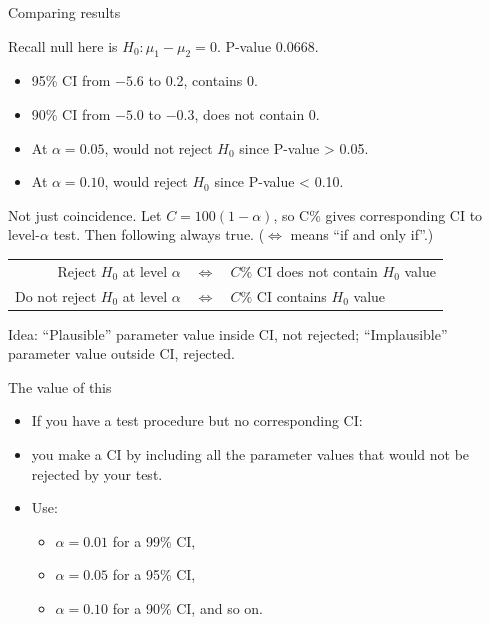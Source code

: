 \documentclass[
  ignorenonframetext,
]{beamer}
\providecommand{\tightlist}{%
  \setlength{\itemsep}{0pt}\setlength{\parskip}{0pt}}
\begin{document}
\begin{frame}{Comparing results}
\protect\hypertarget{comparing-results}{}

Recall null here is \(H_0 : \mu_1 - \mu_2 = 0\). P-value 0.0668.

\begin{itemize}
\tightlist
\item
  95\% CI from \(-5.6\) to 0.2, contains 0.
\item
  90\% CI from \(-5.0\) to \(-0.3\), does not contain 0.
\item
  At \(\alpha = 0.05\), would not reject \(H_0\) since P-value
  \textgreater{} 0.05.
\item
  At \(\alpha = 0.10\), would reject \(H_0\) since P-value \textless{}
  0.10.
\end{itemize}

Not just coincidence. Let \(C = 100(1 - \alpha)\), so C\% gives
corresponding CI to level-\(\alpha\) test. Then following always true.
(\(\iff\) means ``if and only if''.)

\begin{tabular}{|rcl|}
  \hline
  Reject $H_0$ at level $\alpha$ & $\iff$ & $C\%$ CI does not contain $H_0$ value\\
  Do not reject $H_0$ at level $\alpha$ & $\iff$ & $C\%$ CI contains $H_0$ value\\
  \hline
\end{tabular}

Idea: ``Plausible'' parameter value inside CI, not rejected;
``Implausible'' parameter value outside CI, rejected.

\end{frame}

\begin{frame}{The value of this}
\protect\hypertarget{the-value-of-this}{}

\begin{itemize}
\tightlist
\item
  If you have a test procedure but no corresponding CI:
\item
  you make a CI by including all the parameter values that would not be
  rejected by your test.
\item
  Use:

  \begin{itemize}
  \tightlist
  \item
    \(\alpha = 0.01\) for a 99\% CI,
  \item
    \(\alpha = 0.05\) for a 95\% CI,
  \item
    \(\alpha = 0.10\) for a 90\% CI, and so on.
  \end{itemize}
\end{itemize}

\end{frame}
\end{document}

